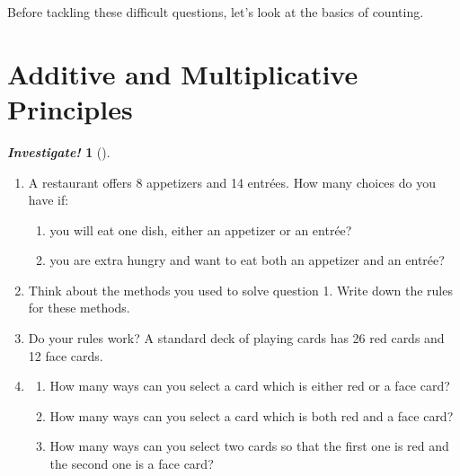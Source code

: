 \documentclass[10pt,]{memoir}
\theoremstyle{plain}
\theoremstyle{definition}
\theoremstyle{definition}
\newtheorem{investigation}[project]{\emph{Investigate!}}
\theoremstyle{definition}
\numberwithin{equation}{chapter}
\begin{document}
Before tackling these difficult questions, let's look at the basics of counting.
%
\typeout{************************************************}
\typeout{************************************************}
\section[Additive and Multiplicative Principles]{Additive and Multiplicative Principles}\label{sec_additiveMultiplicative}
\typeout{************************************************}
\typeout{************************************************}
\begin{investigation}[]\label{investigation-5}
\leavevmode%
\begin{enumerate}
\item\hypertarget{li-370}{}A restaurant offers 8 appetizers and 14 entrées. How many choices do you have if:

\begin{enumerate}
\item\hypertarget{li-371}{} you will eat one dish, either an appetizer or an entrée?
\item\hypertarget{li-372}{}
you are extra hungry and want to eat both an appetizer and an entrée?
\end{enumerate}
\item\hypertarget{li-373}{}Think about the methods you used to solve question 1. Write down the rules for these methods.
\item\hypertarget{li-374}{}Do your rules work? A standard deck of playing cards has 26 red cards and 12 face cards.\item\hypertarget{li-375}{}\begin{enumerate}
\item\hypertarget{li-376}{}
How many ways can you select a card which is either red or a face card?
\item\hypertarget{li-377}{}
How many ways can you select a card which is both red and a face card?
\item\hypertarget{li-378}{}
How many ways can you select two cards so that the first one is red and the second one is a face card?
\end{enumerate}
\end{enumerate}
\end{investigation}
\end{document}
